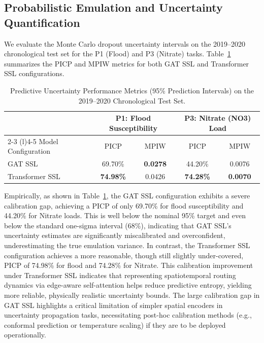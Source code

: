 \documentclass[preprint,12pt]{elsarticle}
\begin{document}
\subsection{Probabilistic Emulation and Uncertainty Quantification}
We evaluate the Monte Carlo dropout uncertainty intervals on the 2019--2020 chronological test set for the P1 (Flood) and P3 (Nitrate) tasks. Table~\ref{tab:mc_dropout} summarizes the PICP and MPIW metrics for both GAT SSL and Transformer SSL configurations.

\begin{table}[H]
\centering
\caption{Predictive Uncertainty Performance Metrics (95\% Prediction Intervals) on the 2019--2020 Chronological Test Set.}\label{tab:mc_dropout}
\begin{tabular}{lcccc}
\toprule
& \multicolumn{2}{c}{P1: Flood Susceptibility} & \multicolumn{2}{c}{P3: Nitrate (NO3) Load} \\
\cmidrule(r){2-3} \cmidrule(l){4-5}
Model Configuration & PICP & MPIW & PICP & MPIW \\
\midrule
GAT SSL & 69.70\% & \textbf{0.0278} & 44.20\% & 0.0076 \\
Transformer SSL & \textbf{74.98\%} & 0.0426 & \textbf{74.28\%} & \textbf{0.0070} \\
\bottomrule
\end{tabular}
\end{table}

Empirically, as shown in Table~\ref{tab:mc_dropout}, the GAT SSL configuration exhibits a severe calibration gap, achieving a PICP of only 69.70\% for flood susceptibility and 44.20\% for Nitrate loads. This is well below the nominal 95\% target and even below the standard one-sigma interval (68\%), indicating that GAT SSL's uncertainty estimates are significantly miscalibrated and overconfident, underestimating the true emulation variance. In contrast, the Transformer SSL configuration achieves a more reasonable, though still slightly under-covered, PICP of 74.98\% for flood and 74.28\% for Nitrate. This calibration improvement under Transformer SSL indicates that representing spatiotemporal routing dynamics via edge-aware self-attention helps reduce predictive entropy, yielding more reliable, physically realistic uncertainty bounds. The large calibration gap in GAT SSL highlights a critical limitation of simpler spatial encoders in uncertainty propagation tasks, necessitating post-hoc calibration methods (e.g., conformal prediction or temperature scaling) if they are to be deployed operationally.
\end{document}
